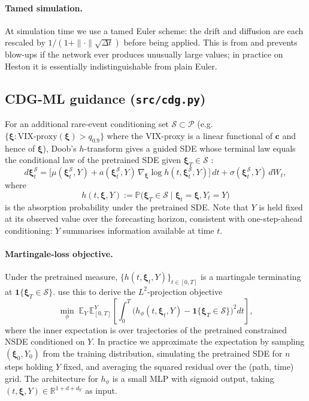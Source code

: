\documentclass[11pt]{article}
\newcommand{\R}{\mathbb{R}}
\newcommand{\E}{\mathbb{E}}
\newcommand{\Prob}{\mathbb{P}}
\newcommand{\ind}{\mathbf{1}}
\newcommand{\xib}{\boldsymbol{\xi}}
\newcommand{\1}{\mathbf{1}}
\begin{document}
\paragraph{Tamed simulation.}
At simulation time we use a tamed Euler scheme: the drift and diffusion are each rescaled by $1/(1 + \|\cdot\|\sqrt{\Delta t})$ before being applied. This is from \citet{hutzenthaler2012} and prevents blow-ups if the network ever produces unusually large values; in practice on Heston it is essentially indistinguishable from plain Euler.

\subsection{CDG-ML guidance (\texttt{src/cdg.py})}

For an additional rare-event conditioning set $\mathcal S \subset \mathcal P$ (e.g.\ $\{\xib : \text{VIX-proxy}(\xib) > q_{0.9}\}$ where the VIX-proxy is a linear functional of $\mathbf c$ and hence of $\xib$), Doob's $h$-transform gives a guided SDE whose terminal law equals the conditional law of the pretrained SDE given $\xib_T \in \mathcal S$ \citep{guo2026}:
\begin{equation}
d\xib^{\mathcal S}_t = \bigl[\mu(\xib^{\mathcal S}_t, Y) + a(\xib^{\mathcal S}_t, Y)\,\nabla_\xib \log h(t, \xib^{\mathcal S}_t, Y)\bigr]\, dt + \sigma(\xib^{\mathcal S}_t, Y)\, dW_t,
\label{eq:guided}
\end{equation}
where
\begin{equation}
h(t, \xib, Y) := \Prob\bigl(\xib_T \in \mathcal S \mid \xib_t = \xib, Y_t = Y\bigr)
\label{eq:h-def}
\end{equation}
is the absorption probability under the pretrained SDE. Note that $Y$ is held fixed at its observed value over the forecasting horizon, consistent with one-step-ahead conditioning: $Y$ summarises information available at time $t$.

\paragraph{Martingale-loss objective.}
Under the pretrained measure, $\{h(t, \xib_t, Y)\}_{t \in [0,T]}$ is a martingale terminating at $\ind\{\xib_T \in \mathcal S\}$. \citet[\S 3.2.1]{guo2026} use this to derive the $L^2$-projection objective
\begin{equation}
\min_\phi \; \E_Y\, \E_{[0,T]}^{Y}\!\left[ \int_0^T \bigl( h_\phi(t, \xib_t, Y) - \ind\{\xib_T \in \mathcal S\} \bigr)^2 dt \right],
\label{eq:cdg-ml}
\end{equation}
where the inner expectation is over trajectories of the pretrained constrained NSDE conditioned on $Y$. In practice we approximate the expectation by sampling $(\xib_0, Y_0)$ from the training distribution, simulating the pretrained SDE for $n$ steps holding $Y$ fixed, and averaging the squared residual over the (path, time) grid. The architecture for $h_\phi$ is a small MLP with sigmoid output, taking $(t, \xib, Y) \in \R^{1 + d + d_Y}$ as input.
\end{document}
